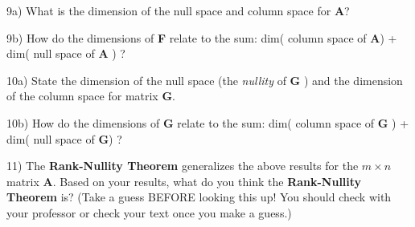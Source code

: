 \documentclass{article}
\begin{document}
\begin{flushleft}
\vspace{0.15in}

9a) What is the dimension of the null space and column space for \textbf{A}?

\vspace{0.75in}

9b) How do the dimensions of \textbf{F} relate to the sum: dim( column space of \textbf{A}) + dim( null space of \textbf{A} ) ?

\vspace{1in}

10a) State the dimension of the null space (the \textit{nullity} of \textbf{G} ) and the dimension of the column space for matrix \textbf{G}.

\vspace{0.75in}

10b) How do the dimensions of \textbf{G} relate to the sum: dim( column space of \textbf{G} ) + dim( null space of \textbf{G}) ?

\vspace{1in}

11) The \textbf{Rank-Nullity Theorem} generalizes the above results for the $m\times n$ matrix \textbf{A}. Based on your results, what do you think the \textbf{Rank-Nullity Theorem} is? (Take a guess BEFORE looking this up! You should check with your professor or check your text once you make a guess.)

\vspace{0.75in}


\end{flushleft}
\end{document}
